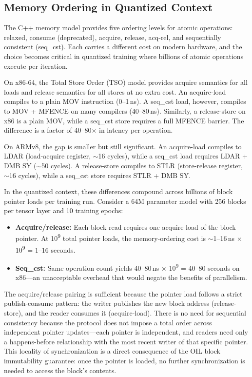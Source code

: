 \subsection{Memory Ordering in Quantized Context}

The C++ memory model provides five ordering levels for atomic operations: relaxed, consume (deprecated), acquire, release, acq-rel, and sequentially consistent (seq\_cst). Each carries a different cost on modern hardware, and the choice becomes critical in quantized training where billions of atomic operations execute per iteration.

On x86-64, the Total Store Order (TSO) model provides acquire semantics for all loads and release semantics for all stores at no extra cost. An acquire-load compiles to a plain MOV instruction (0--1\,ns). A seq\_cst load, however, compiles to MOV + MFENCE on many compilers (40--80\,ns). Similarly, a release-store on x86 is a plain MOV, while a seq\_cst store requires a full MFENCE barrier. The difference is a factor of 40--80$\times$ in latency per operation.

On ARMv8, the gap is smaller but still significant. An acquire-load compiles to LDAR (load-acquire register, $\sim$16 cycles), while a seq\_cst load requires LDAR + DMB SY ($\sim$50 cycles). A release-store compiles to STLR (store-release register, $\sim$16 cycles), while a seq\_cst store requires STLR + DMB SY.

In the quantized context, these differences compound across billions of block pointer loads per training run. Consider a 64M parameter model with 256 blocks per tensor layer and 10 training epochs:

\begin{itemize}
    \item \textbf{Acquire/release:} Each block read requires one acquire-load of the block pointer. At 10\textsuperscript{9} total pointer loads, the memory-ordering cost is $\sim$1--16\,ns $\times$ 10\textsuperscript{9} = 1--16 seconds.
    \item \textbf{Seq\_cst:} Same operation count yields 40--80\,ns $\times$ 10\textsuperscript{9} = 40--80 seconds on x86---an unacceptable overhead that would negate the benefits of parallelism.
\end{itemize}

The acquire/release pairing is sufficient because the pointer load follows a strict publish-consume pattern: the writer publishes the new block address (release-store), and the reader consumes it (acquire-load). There is no need for sequential consistency because the protocol does not impose a total order across independent pointer updates---each pointer is independent, and readers need only a happens-before relationship with the most recent writer of that specific pointer. This locality of synchronization is a direct consequence of the OIL block immutability guarantee: once the pointer is loaded, no further synchronization is needed to access the block's contents.

